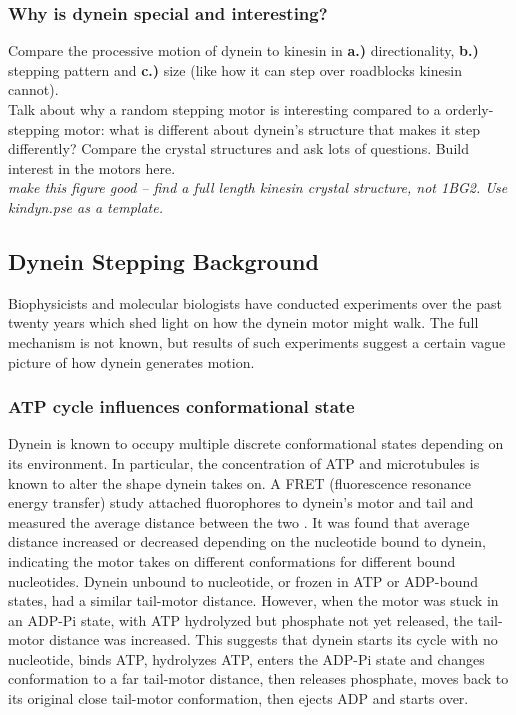 \documentclass[10pt]{article} %
\begin{document}
\subsubsection{Why is dynein special and interesting?}
Compare the processive motion of dynein to kinesin in \textbf{a.)} directionality, \textbf{b.)} stepping pattern and \textbf{c.)} size (like how it can step over roadblocks kinesin cannot).\\

Talk about why a random stepping motor is interesting compared to a orderly-stepping motor: what is different about dynein's structure that makes it step differently? Compare the crystal structures and ask lots of questions. Build interest in the motors here.\\


\textit{make this figure good -- find a full length kinesin crystal structure, not 1BG2. Use kindyn.pse as a template.}

\subsection{Dynein Stepping Background}
Biophysicists and molecular biologists have conducted experiments over the past twenty years which shed light on how the dynein motor might walk. The full mechanism is not known, but results of such experiments suggest a certain vague picture of how dynein generates motion.\\

\subsubsection{ATP cycle influences conformational state}
Dynein is known to occupy multiple discrete conformational states depending on its environment. In particular, the concentration of ATP and microtubules is known to alter the shape dynein takes on. A FRET (fluorescence resonance energy transfer) study attached fluorophores to dynein's motor and tail and measured the average distance between the two \cite{FRETstatepaper}. It was found that average distance increased or decreased depending on the nucleotide bound to dynein, indicating the motor takes on different conformations for different bound nucleotides. Dynein unbound to nucleotide, or frozen in ATP or ADP-bound states, had a similar tail-motor distance. However, when the motor was stuck in an ADP-Pi state, with ATP hydrolyzed but phosphate not yet released, the tail-motor distance was increased. This suggests that dynein starts its cycle with no nucleotide, binds ATP, hydrolyzes ATP, enters the ADP-Pi state and changes conformation to a far tail-motor distance, then releases phosphate, moves back to its original close tail-motor conformation, then ejects ADP and starts over.\\
\end{document}
